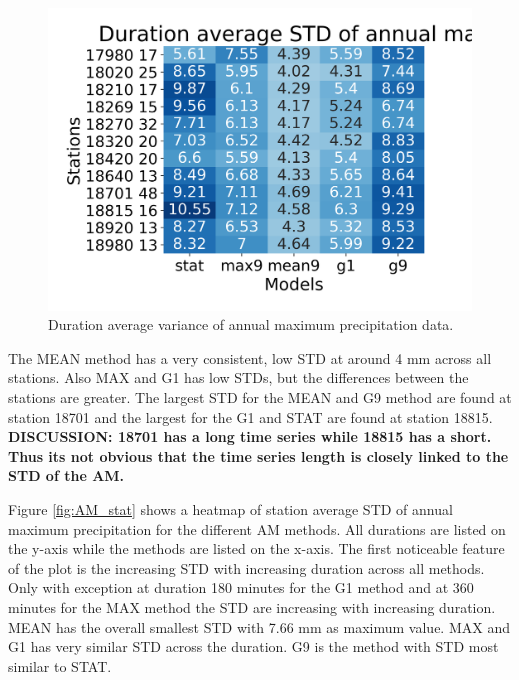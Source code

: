 \begin{figure}[hbt!]
    \centering
    \includegraphics[scale=0.6]{figures/AM_dur_avg_std.png}
    \caption{Duration average variance of annual maximum precipitation data.}
    \label{fig:AM_dur}
\end{figure}

The MEAN method has a very consistent, low STD at around 4 mm across all stations. Also MAX and G1 has low STDs, but the differences between the stations are greater. The largest STD for the MEAN and G9 method are found at station 18701 and the largest for the G1 and STAT are found at station 18815. \textbf{DISCUSSION: 18701 has a long time series while 18815 has a short. Thus its not obvious that the time series length is closely linked to the STD of the AM.}

Figure \ref{fig:AM_stat} shows a heatmap of station average STD of annual maximum precipitation for the different AM methods. All durations are listed on the y-axis while the methods are listed on the x-axis. The first noticeable feature of the plot is the increasing STD with increasing duration across all methods. Only with exception at duration 180 minutes for the G1 method and at 360 minutes for the MAX method the STD are increasing with increasing duration. MEAN has the overall smallest STD with 7.66 mm as maximum value. MAX and G1 has very similar STD across the duration. G9 is the method with STD most similar to STAT.   

